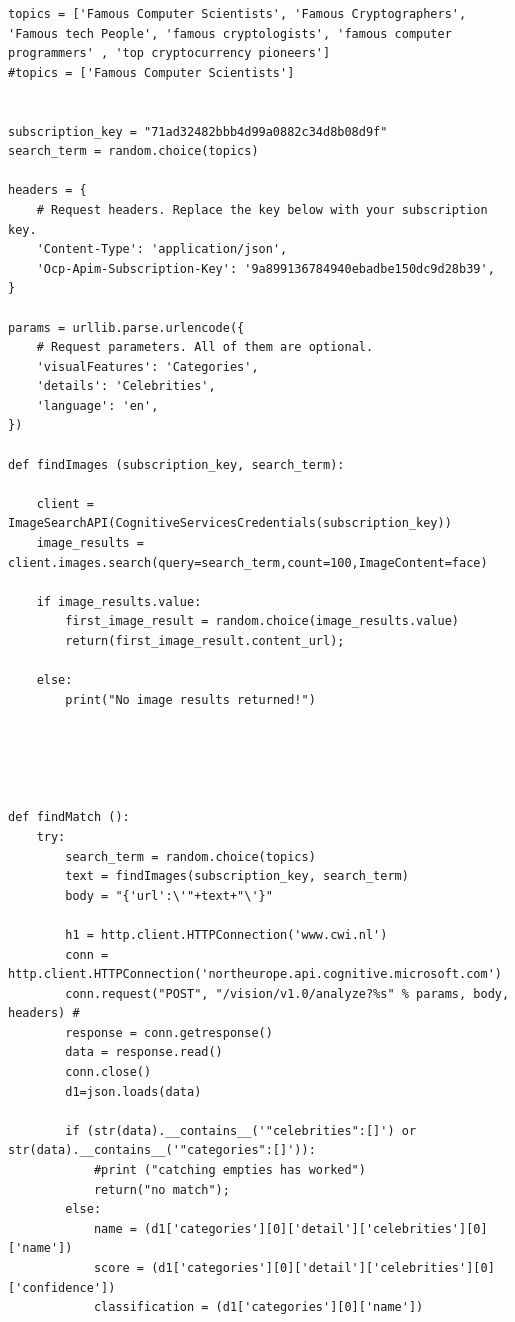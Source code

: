 \documentclass[12pt,a4paper]{article}
\begin{document}
\begin{appendices}
\begin{lstlisting}
topics = ['Famous Computer Scientists', 'Famous Cryptographers', 'Famous tech People', 'famous cryptologists', 'famous computer programmers' , 'top cryptocurrency pioneers']
#topics = ['Famous Computer Scientists']


subscription_key = "71ad32482bbb4d99a0882c34d8b08d9f"
search_term = random.choice(topics)   

headers = {
    # Request headers. Replace the key below with your subscription key.
    'Content-Type': 'application/json',
    'Ocp-Apim-Subscription-Key': '9a899136784940ebadbe150dc9d28b39',
}

params = urllib.parse.urlencode({
    # Request parameters. All of them are optional.
    'visualFeatures': 'Categories',
    'details': 'Celebrities',
    'language': 'en',
})

def findImages (subscription_key, search_term):

    client = ImageSearchAPI(CognitiveServicesCredentials(subscription_key)) 
    image_results = client.images.search(query=search_term,count=100,ImageContent=face) 

    if image_results.value:
        first_image_result = random.choice(image_results.value)  
        return(first_image_result.content_url); 

    else:
        print("No image results returned!") 
    
    



def findMatch (): 
    try:    
        search_term = random.choice(topics) 
        text = findImages(subscription_key, search_term)  
        body = "{'url':\'"+text+"\'}" 

        h1 = http.client.HTTPConnection('www.cwi.nl')
        conn = http.client.HTTPConnection('northeurope.api.cognitive.microsoft.com') 
        conn.request("POST", "/vision/v1.0/analyze?%s" % params, body, headers) #
        response = conn.getresponse() 
        data = response.read() 
        conn.close() 
        d1=json.loads(data)     
         
        if (str(data).__contains__('"celebrities":[]') or str(data).__contains__('"categories":[]')):  
            #print ("catching empties has worked")
            return("no match");    
        else:  
            name = (d1['categories'][0]['detail']['celebrities'][0]['name']) 
            score = (d1['categories'][0]['detail']['celebrities'][0]['confidence']) 
            classification = (d1['categories'][0]['name'])         
        


\end{lstlisting}
\end{appendices}
\end{document}
